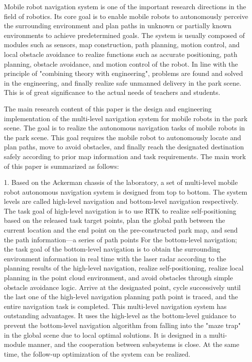\begin{abstract*}
  Mobile robot navigation system is one of the important research directions in the field of robotics. Its core goal is to enable mobile robots to autonomously perceive the surrounding environment and plan paths in unknown or partially known environments to achieve predetermined goals. The system is usually composed of modules such as sensors, map construction, path planning, motion control, and local obstacle avoidance to realize functions such as accurate positioning, path planning, obstacle avoidance, and motion control of the robot. In line with the principle of "combining theory with engineering", problems are found and solved in the engineering, and finally realize safe unmanned delivery in the park scene. This is of great significance to the actual needs of teachers and students.

  The main research content of this paper is the design and engineering implementation of the multi-level navigation system for mobile robots in the park scene. The goal is to realize the autonomous navigation tasks of mobile robots in the park scene. This goal requires the mobile robot to autonomously locate and plan paths, move to avoid obstacles, and finally reach the designated destination safely according to prior map information and task requirements. The main work of this paper is summarized as follows:

  1. Based on the Ackerman chassis of the laboratory, a set of multi-level mobile robot autonomous navigation system is designed from top to bottom. The system levels are called high-level navigation and bottom-level navigation respectively. The task goal of high-level navigation is to use RTK to realize self-positioning based on the released task target points, plan the global path between the current location and the end point on the pre-constructed park map, and send the path information—a series of path points For the bottom-level navigation; the task goal of the bottom-level navigation is to obtain the surrounding environment information in real time with the laser radar according to the planning results of the high-level navigation, realize self-positioning, realize local planning in the point cloud environment, and avoid obstacles through simple obstacle avoidance logic. Arrive at the designated point, cycle successively until the last one of the high-level navigation planning path point is traced, and the entire navigation task is completed. This multi-level navigation system has outstanding advantages. It uses the high-level as the bottom-level guidance to prevent the bottom-level navigation algorithm from falling into the "maze trap" in the global scene due to local optimal solutions. It is designed in a multi-module manner, and the cooperation between subsystems is close. At the same time, the follow-up optimization of the system can be realized.


\end{abstract*}
